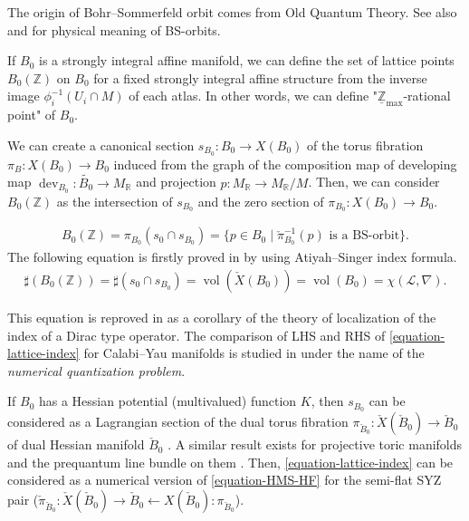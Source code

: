 \documentclass[a4paper,dvipdfmx,reqno,12pt]{amsart}
\theoremstyle{definition}
\newcommand{\Z}{\mathbb{Z}}%
\newcommand{\mcal}[1]{\mathcal{#1}}%
\newcommand{\opn}[1]{\operatorname{#1}}
\numberwithin{equation}{section}
\begin{document}
The origin of Bohr--Sommerfeld orbit comes from
Old Quantum Theory.
See also \cite[15.2, Chapter 22]{MR3112817}
and \cite[Remark 4.3]{MR1270931} for physical meaning 
of BS-orbits.





If $B_0$ is a strongly integral affine manifold,
we can define the set of lattice points $B_0(\Z)$ 
on $B_0$ for a fixed strongly integral affine structure from 
the inverse image $\phi^{-1}_i(U_i\cap M)$ of each atlas.
In other words, we can define 
"$\underline{\Z}_{\max}$-rational point" of $B_0$.


We can create a canonical section 
$s_{B_0}\colon B_0 \to X(B_0)$ of the torus fibration
 $\pi_B:X(B_0)\to B_0$
induced from the graph of the composition map of developing map
$\opn{dev}_{B_0}\colon \widetilde{B_0}\to M_{{\mathbb{R}}}$ 
\cite[p.641]{goldmanRadianceObstructionParallel1984a} and projection
$p:M_{{\mathbb{R}}}\to M_{{\mathbb{R}}}/M$. 
Then, we can consider $B_0(\Z)$ as the intersection of 
$s_{B_0}$ and the zero section of $\pi_{B_0}:X(B_0)\to B_0$.

\begin{align}
B_0(\mathbb{Z})=\pi_{B_0}(s_0\cap s_{B_0})
=\{p\in B_0 \mid  \check{\pi}_{B_0}^{-1}(p) 
\text{ is a BS-orbit}\}.
\end{align}
The following equation is firstly proved in 
\cite[Corollary 4.1]{MR1461965} by using Atiyah--Singer index formula.
\begin{align} \label{equation-lattice-index}
\sharp (B_0(\Z))=\sharp (s_0\cap s_{B_0})
=\opn{vol}(\check{X}(B_0))=\opn{vol}(B_0)
=\chi(\mcal{L},\nabla).
\end{align}

This equation is reproved in \cite{MR2676658} as a 
corollary of the theory of localization of the 
index of a Dirac type operator.
The comparison of LHS and RHS of 
\cref{equation-lattice-index} for
Calabi--Yau manifolds is studied in 
\cite{1999math......2027T} under 
the name of the \emph{numerical quantization problem}.

If $B_0$ has a Hessian potential (multivalued) function $K$, then $s_{B_0}$ can be 
considered as a Lagrangian section of the dual torus 
fibration $\pi_{\check{B}_0}\colon 
\check{X}(\check{B}_0)\to \check{B}_0$ of dual Hessian
manifold $\check{B}_0$ \cite[Proposition 6.9]{MR2567952}.
A similar result exists for projective toric manifolds 
and the prequantum line bundle on them 
\cite[Theorem 3.20]{yamaguchimaster}. 
Then, \cref{equation-lattice-index} can be considered
as a numerical version of \cref{equation-HMS-HF}
for the semi-flat SYZ pair 
($\check{\pi}_{\check{B}_0}\colon \check{X}(\check{B}_0)
\to \check{B}_0 \leftarrow X(\check{B}_0)\colon \pi_{\check{B}_0}$). 
\end{document}
